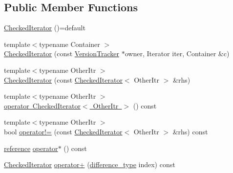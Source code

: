 \subsection*{Public Member Functions}
\begin{DoxyCompactItemize}
\item 
\mbox{\hyperlink{classstanfordcpplib_1_1collections_1_1CheckedIterator_afabc7366d817b66b8789738fdcb3f971}{Checked\+Iterator}} ()=default
\item 
{\footnotesize template$<$typename Container $>$ }\\\mbox{\hyperlink{classstanfordcpplib_1_1collections_1_1CheckedIterator_a315a6fed7c4b9a5eecd6afeeb8c593e4}{Checked\+Iterator}} (const \mbox{\hyperlink{classstanfordcpplib_1_1collections_1_1VersionTracker}{Version\+Tracker}} $\ast$owner, Iterator iter, Container \&c)
\item 
{\footnotesize template$<$typename Other\+Itr $>$ }\\\mbox{\hyperlink{classstanfordcpplib_1_1collections_1_1CheckedIterator_aef940829f21f65a570e3d20e121644b5}{Checked\+Iterator}} (const \mbox{\hyperlink{classstanfordcpplib_1_1collections_1_1CheckedIterator}{Checked\+Iterator}}$<$ Other\+Itr $>$ \&rhs)
\item 
{\footnotesize template$<$typename Other\+Itr $>$ }\\\mbox{\hyperlink{classstanfordcpplib_1_1collections_1_1CheckedIterator_ab8bcfba1ddc6aeb8c2a17910f90b12d8}{operator Checked\+Iterator$<$ Other\+Itr $>$}} () const
\item 
{\footnotesize template$<$typename Other\+Itr $>$ }\\bool \mbox{\hyperlink{classstanfordcpplib_1_1collections_1_1CheckedIterator_a9530fcc7a3cff36f5079b6d059df23ee}{operator!=}} (const \mbox{\hyperlink{classstanfordcpplib_1_1collections_1_1CheckedIterator}{Checked\+Iterator}}$<$ Other\+Itr $>$ \&rhs) const
\item 
\mbox{\hyperlink{classstanfordcpplib_1_1collections_1_1CheckedIterator_a57d818f6bd24dee2a8803cb3be635373}{reference}} \mbox{\hyperlink{classstanfordcpplib_1_1collections_1_1CheckedIterator_ab086ec1916db61d1ab56a801abca8d91}{operator$\ast$}} () const
\item 
\mbox{\hyperlink{classstanfordcpplib_1_1collections_1_1CheckedIterator}{Checked\+Iterator}} \mbox{\hyperlink{classstanfordcpplib_1_1collections_1_1CheckedIterator_a820e470a40d67df841dc2f4d63827f4d}{operator+}} (\mbox{\hyperlink{classstanfordcpplib_1_1collections_1_1CheckedIterator_ad050e8e82b0962bb9ebd0e7c23b436ac}{difference\+\_\+type}} index) const

\end{DoxyCompactItemize}
